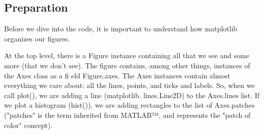 \subsection{Preparation}
Before we dive into the code, it is important to understand how matplotlib organizes
our figures.

At the top level, there is a Figure instance containing all that we see and some more (that
we don't see). The figure contains, among other things, instances of the Axes class as a fi eld
Figure.axes. The Axes instances contain almost everything we care about: all the lines,
points, and ticks and labels. So, when we call plot(), we are adding a line (matplotlib.
lines.Line2D) to the Axes.lines list. If we plot a histogram (hist()), we are adding
rectangles to the list of Axes.patches ("patches" is the term inherited from MATLAB™,
and represents the "patch of color" concept).

